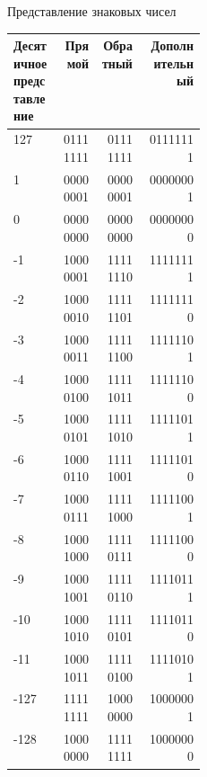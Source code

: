 \documentclass{beamer}
\begin{document}
    \begin{frame}{Представление знаковых чисел}
        \begin{table}
        \small
            \begin{tabular}{|p{0.25\linewidth}|r|r|r|} 
            \hline Десятичное представление & Прямой & Обратный & Дополнительный \\
            \hline 127    &  01111111  &  01111111  &  01111111  \\      
            \hline 1      &  00000001  &  00000001  &  00000001  \\     
            \hline 0      &  00000000  &  00000000  &  00000000  \\     
            \hline -1     &  10000001  &  11111110  &  11111111  \\     
            \hline -2     &  10000010  &  11111101  &  11111110  \\     
            \hline -3     &  10000011  &  11111100  &  11111101  \\     
            \hline -4     &  10000100  &  11111011  &  11111100  \\     
            \hline -5     &  10000101  &  11111010  &  11111011  \\     
            \hline -6     &  10000110  &  11111001  &  11111010  \\     
            \hline -7     &  10000111  &  11111000  &  11111001  \\     
            \hline -8     &  10001000  &  11110111  &  11111000  \\     
            \hline -9     &  10001001  &  11110110  &  11110111  \\     
            \hline -10    &  10001010  &  11110101  &  11110110  \\     
            \hline -11    &  10001011  &  11110100  &  11110101  \\     
            \hline -127   &  11111111  &  10000000  &  10000001  \\     
            \hline -128   &  10000000  &  11111111  &  10000000  \\
            \hline
            \end{tabular}
        \end{table}
    \end{frame}
\end{document}
